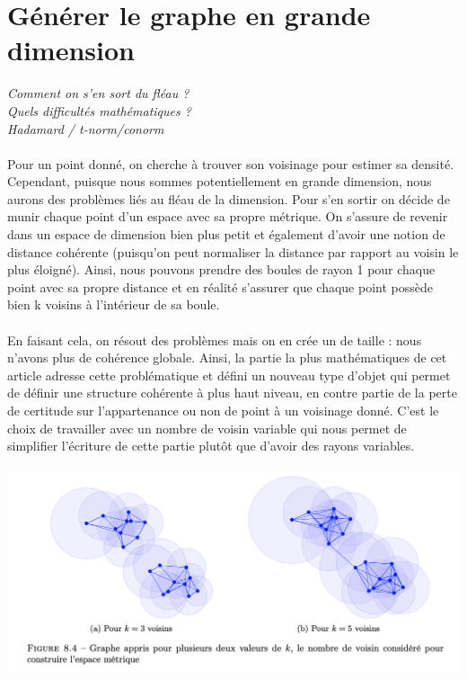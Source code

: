     \section{Générer le graphe en grande dimension}
        \textit{
        Comment on s'en sort du fléau ?
        \\
        Quels difficultés mathématiques ?
        \\
        Hadamard / t-norm/conorm
        }
        \\
        \\
        Pour un point donné, on cherche à trouver son voisinage pour estimer sa densité. Cependant, puisque nous sommes potentiellement en grande dimension, nous aurons des problèmes liés au fléau de la dimension. Pour s’en sortir on décide de munir chaque point d’un espace avec sa propre métrique. On s’assure de revenir dans un espace de dimension bien plus petit et également d’avoir une notion de distance cohérente (puisqu’on peut normaliser la distance par rapport au voisin le plus éloigné). Ainsi, nous pouvons prendre des boules de rayon 1 pour chaque point avec sa propre distance et en réalité s’assurer que chaque point possède bien k voisins à l’intérieur de sa boule.
        \\
        \\
        En faisant cela, on résout des problèmes mais on en crée un de taille : nous n’avons plus de cohérence globale. Ainsi, la partie la plus mathématiques de cet article adresse cette problématique et défini un nouveau type d’objet qui permet de définir une structure cohérente à plus haut niveau, en contre partie de la perte de certitude sur l’appartenance ou non de point à un voisinage donné. C’est le choix de travailler avec un nombre de voisin variable qui nous permet de simplifier l’écriture de cette partie plutôt que d’avoir des rayons variables.
        \\
        \\
        \includegraphics[width=\linewidth]{./img/umap/graph}
